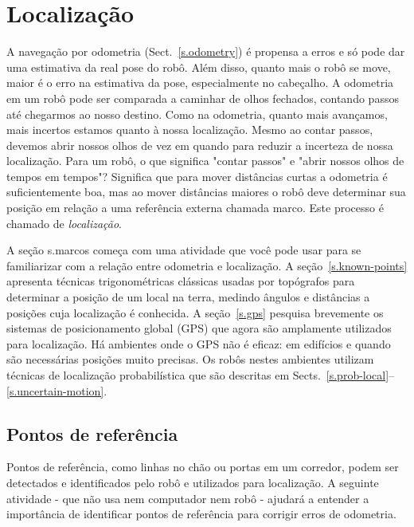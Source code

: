
\chapter{Localização}\label{ch.local}

A navegação por odometria (Sect.~\ref{s.odometry}) é propensa a erros e só pode dar uma estimativa da real pose do robô. Além disso, quanto mais o robô se move, maior é o erro na estimativa da pose, especialmente no cabeçalho. A odometria em um robô pode ser comparada a caminhar de olhos fechados, contando passos até chegarmos ao nosso destino. Como na odometria, quanto mais avançamos, mais incertos estamos quanto à nossa localização. Mesmo ao contar passos, devemos abrir nossos olhos de vez em quando para reduzir a incerteza de nossa localização. Para um robô, o que significa "contar passos" e "abrir nossos olhos de tempos em tempos"? Significa que para mover distâncias curtas a odometria é suficientemente boa, mas ao mover distâncias maiores o robô deve determinar sua posição em relação a uma referência externa chamada marco. Este processo é chamado de \emph{localização}.

A seção {s.marcos} começa com uma atividade que você pode usar para se familiarizar com a relação entre odometria e localização. A seção~\ref{s.known-points} apresenta técnicas trigonométricas clássicas usadas por topógrafos para determinar a posição de um local na terra, medindo ângulos e distâncias a posições cuja localização é conhecida. A seção~\ref{s.gps} pesquisa brevemente os sistemas de posicionamento global (GPS) que agora são amplamente utilizados para localização. Há ambientes onde o GPS não é eficaz: em edifícios e quando são necessárias posições muito precisas. Os robôs nestes ambientes utilizam técnicas de localização probabilística que são descritas em Sects.~\ref{s.prob-local}--\ref{s.uncertain-motion}.

\section{Pontos de referência}\label{s.landmarks}

Pontos de referência, como linhas no chão ou portas em um corredor, podem ser detectados e identificados pelo robô e utilizados para localização. A seguinte atividade - que não usa nem computador nem robô - ajudará a entender a importância de identificar pontos de referência para corrigir erros de odometria.

